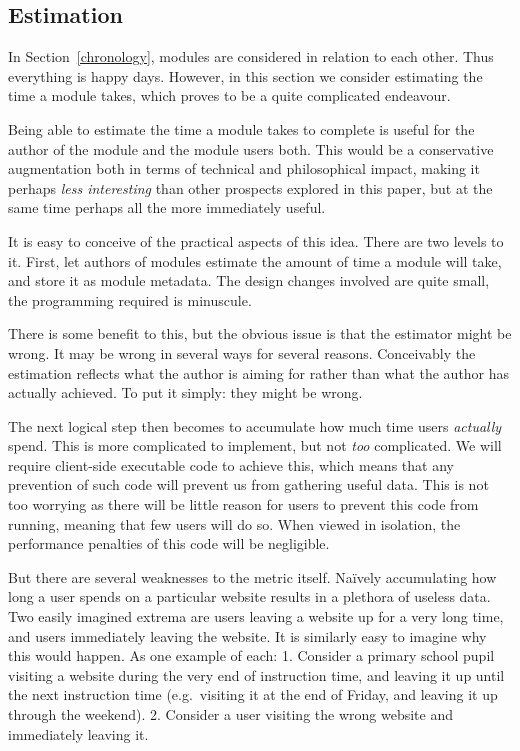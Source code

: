 \subsection{Estimation}
\label{estimation}
In Section~\ref{chronology}, modules are considered in relation to each other. 
Thus everything is happy days. However, in this section we consider estimating 
the time a module takes, which proves to be a quite complicated endeavour.

Being able to estimate the time a module takes to complete is useful for the 
author of the module and the module users both. This would be a conservative 
augmentation both in terms of technical and philosophical impact, making it 
perhaps \emph{less interesting} than other prospects explored in this paper, 
but at the same time perhaps all the more immediately useful.

It is easy to conceive of the practical aspects of this idea. There are two 
levels to it. First, let authors of modules estimate the amount of time a 
module will take, and store it as module metadata. The design changes involved 
are quite small, the programming required is minuscule.

There is some benefit to this, but the obvious issue is that the estimator 
might be wrong. It may be wrong in several ways for several reasons. 
Conceivably the estimation reflects what the author is aiming for rather than 
what the author has actually achieved. To put it simply: they might be wrong.

The next logical step then becomes to accumulate how much time users 
\emph{actually} spend. This is more complicated to implement, but not 
\emph{too} complicated. We will require client-side executable code to achieve 
this, which means that any prevention of such code will prevent us from 
gathering useful data. This is not too worrying as there will be little reason 
for users to prevent this code from running, meaning that few users will do 
so. When viewed in isolation, the performance penalties of this code will be 
negligible.

But there are several weaknesses to the metric itself. Naïvely accumulating 
how long a user spends on a particular website results in a plethora of 
useless data. Two easily imagined extrema are users leaving a website up for a 
very long time, and users immediately leaving the website. It is similarly 
easy to imagine why this would happen. As one example of each: 1. Consider a 
primary school pupil visiting a website during the very end of instruction 
time, and leaving it up until the next instruction time (e.g.\ visiting it at 
the end of Friday, and leaving it up through the weekend). 2. Consider a user 
visiting the wrong website and immediately leaving it.

